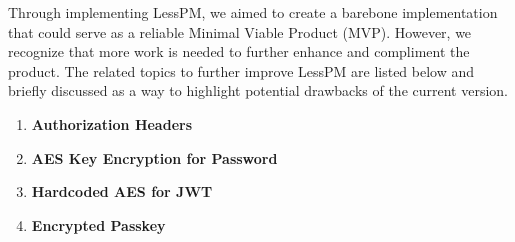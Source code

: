 Through implementing LessPM, we aimed to create a barebone implementation that could serve as a reliable Minimal
    Viable Product (MVP). However, we recognize that more work is needed to further enhance and compliment the product.
    The related topics to further improve LessPM are listed below and briefly discussed as a way to highlight
    potential drawbacks of the current version.

    \begin{enumerate}[label=$\blacktriangleright$]
        \item \textbf{Authorization Headers}
        \item \textbf{AES Key Encryption for Password}
        \item \textbf{Hardcoded AES for JWT}
        \item \textbf{Encrypted Passkey}
        \iffalse
        \item \textbf{Credential ID} \newline In its current implementation, LessPM supports a single registered
        authenticator per username to maintain a focused security approach.
        During registration, the server checks the database for an existing username similar to the incoming one
        and aborts the registration ceremony if a match is found.
        While WebAuthn permits users to have multiple authenticators, limiting this feature in the initial iteration of
        LessPM helps ensure a more controlled security environment.
        As the system evolves, considering the addition of support for multiple authenticators can be weighed against
        potential security risks and benefits.
        \fi
    \end{enumerate}